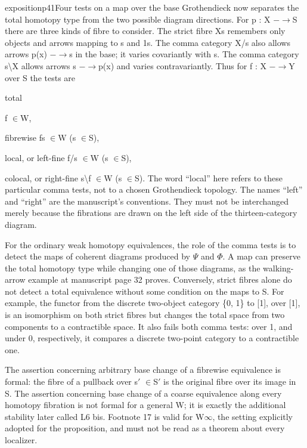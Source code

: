 \begin{itemize}
\begin{dcomment}{exposition}{p41}{Four tests on a map over the base}
Grothendieck now separates the total homotopy type from the two possible diagram directions. For p : X \ensuremath{-}\ensuremath{\to}S there are three kinds of fibre to consider. The strict fibre Xs remembers only objects and arrows mapping to s and 1s. The comma category X/s also allows arrows p(x) \ensuremath{-}\ensuremath{\to}s in the base; it varies covariantly with s. The comma category s\textbackslash{}X allows arrows s \ensuremath{-}\ensuremath{\to}p(x) and varies contravariantly. Thus for f : X \ensuremath{-}\ensuremath{\to}Y over S the tests are

total

f \ensuremath{\in}W,

fibrewise fs \ensuremath{\in}W (s \ensuremath{\in}S),

local, or left-fine f/s \ensuremath{\in}W (s \ensuremath{\in}S),

colocal, or right-fine s\textbackslash{}f \ensuremath{\in}W (s \ensuremath{\in}S). The word “local” here refers to these particular comma tests, not to a chosen Grothendieck topology. The names “left” and “right” are the manuscript’s conventions. They must not be interchanged merely because the fibrations are drawn on the left side of the thirteen-category diagram.

For the ordinary weak homotopy equivalences, the role of the comma tests is to detect the maps of coherent diagrams produced by \ensuremath{\Psi} and \ensuremath{\Phi}. A map can preserve the total homotopy type while changing one of those diagrams, as the walking-arrow example at manuscript page 32 proves. Conversely, strict fibres alone do not detect a total equivalence without some condition on the maps to S. For example, the functor from the discrete two-object category \{0, 1\} to [1], over [1], is an isomorphism on both strict fibres but changes the total space from two components to a contractible space. It also fails both comma tests: over 1, and under 0, respectively, it compares a discrete two-point category to a contractible one.

The assertion concerning arbitrary base change of a fibrewise equivalence is formal: the fibre of a pullback over s\ensuremath{\prime} \ensuremath{\in}S\ensuremath{\prime} is the original fibre over its image in S. The assertion concerning base change of a coarse equivalence along every homotopy fibration is not formal for a general W; it is exactly the additional stability later called L6 bis. Footnote 17 is valid for W\ensuremath{\infty}, the setting explicitly adopted for the proposition, and must not be read as a theorem about every localizer.


\end{dcomment}
\end{itemize}
